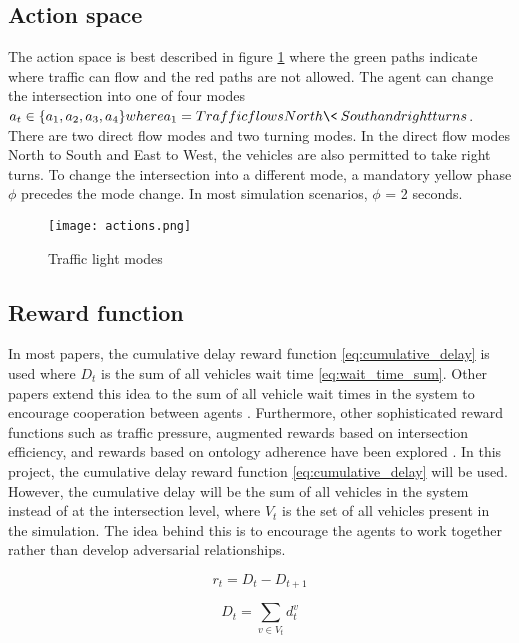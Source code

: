 \documentclass[letterpaper]{article} %
\begin{document}
\subsection{Action space}
The action space is best described in figure \ref{fig:action_space} where the green paths indicate where traffic can flow and the red paths are not allowed.
The agent can change the intersection into one of four modes \(a_t \in \{a_1, a_2, a_3, a_4\} where a_1 = Traffic flows North\<\-\>South and right turns\).
There are two direct flow modes and two turning modes.
In the direct flow modes North to South and East to West, the vehicles are also permitted to take right turns.
To change the intersection into a different mode, a mandatory yellow phase $\phi$ precedes the mode change.
In most simulation scenarios, $\phi$ = 2 seconds.

\begin{figure}[htbp]
  \centering
  \texttt{[image: actions.png]}
  \caption{Traffic light modes \cite{sumorl}}
  \label{fig:action_space}
\end{figure}

\subsection{Reward function}
In most papers, the cumulative delay reward function \ref{eq:cumulative_delay} is used where \(D_t\) is the sum of all vehicles wait time \ref{eq:wait_time_sum}.
Other papers extend this idea to the sum of all vehicle wait times in the system to encourage cooperation between agents \cite{10.3389/frai.2022.805823}.
Furthermore, other sophisticated reward functions such as traffic pressure, augmented rewards based on intersection efficiency, and rewards based on ontology adherence have been explored \cite{ault2021reinforcement} \cite{Ghanadbashi2023}.
In this project, the cumulative delay reward function \ref{eq:cumulative_delay} will be used.
However, the cumulative delay will be the sum of all vehicles in the system instead of at the intersection level, where \(V_t\) is the set of all vehicles present in the simulation.
The idea behind this is to encourage the agents to work together rather than develop adversarial relationships.

\begin{equation}
r_t = D_t - D_{t+1}
\label{eq:cumulative_delay}
\end{equation}

\begin{equation}
D_t = \sum_{v \in V_t} d_t^v
\label{eq:wait_time_sum}
\end{equation}
\end{document}
